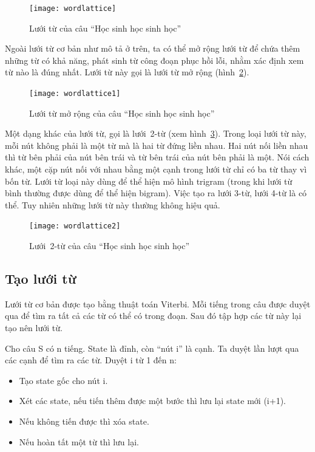 \documentclass[a4paper,oneside,14pt]{extbook} %
\begin{document}
\begin{figure}[htbp]
  \centering
  \texttt{[image: wordlattice]}
  \caption{Lưới từ của câu ``Học sinh học sinh học''}
  \label{fig:wordlattice}
\end{figure}

Ngoài lưới từ cơ bản như mô tả ở trên, ta có thể mở rộng lưới từ để
chứa thêm những từ có khả năng, phát sinh từ công đoạn phục hồi lỗi,
nhằm xác định xem từ nào là đúng nhất. Lưới từ này gọi là lưới từ mở
rộng (hình~\ref{fig:wordlattice1}). 

\begin{figure}[htbp]
  \centering
  \texttt{[image: wordlattice1]}
  \caption{Lưới từ mở rộng của câu ``Học sinh học sinh học''}
  \label{fig:wordlattice1}
\end{figure}

Một dạng khác của lưới từ, gọi là lưới~2-từ  (xem
hình~\ref{fig:wordlattice2}). Trong loại lưới từ này, 
mỗi nút không phải là một từ mà là hai từ đứng liền nhau. Hai nút nối
liền nhau thì từ bên phải của nút bên trái và từ bên trái của nút bên
phải là một. Nói cách khác, một cặp nút nối với nhau bằng một cạnh
trong lưới từ chỉ có ba từ thay vì bốn từ. Lưới từ loại này dùng để
thể hiện mô hình tri\-gram (trong khi lưới từ bình thường được dùng để
thể hiện bi\-gram). Việc tạo ra lưới 3-từ, lưới 4-từ là có thể. Tuy
nhiên những lưới từ này thường không hiệu quả. 

\begin{figure}[htbp]
  \centering
  \texttt{[image: wordlattice2]}
  \caption{Lưới~2-từ của câu ``Học sinh học sinh học''}
  \label{fig:wordlattice2}
\end{figure}

\subsection{Tạo lưới từ}
\label{sub:lattice:creation}

Lưới từ cơ bản được tạo bằng thuật toán Viterbi. Mỗi tiếng trong câu
được duyệt qua để tìm ra tất cả các từ có thể có trong đoạn. Sau đó
tập hợp các từ này lại tạo nên lưới từ.

\begin{algo}\caption{Tạo lưới từ (cơ bản)}
Cho câu S có n tiếng. State là đỉnh, còn ``nút i'' là cạnh. Ta duyệt
lần lượt qua các cạnh để tìm  ra các từ. Duyệt i từ 1 đến n:
\begin{itemize}
\item Tạo state gốc cho nút i.
\item Xét các state, nếu tiến thêm được một bước thì lưu lại state mới (i+1).
\item Nếu không tiến được thì xóa state.
\item Nếu hoàn tất một từ thì lưu lại.
\end{itemize}
\end{algo}
\end{document}
